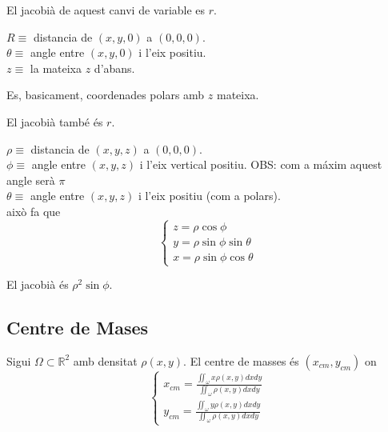 \documentclass[../main.tex]{subfiles}
\begin{document}
    \begin{proposicio}
        El jacobià de aquest canvi de variable es $r$.
    \end{proposicio}
    \begin{definicio}
        $\;$\\
        $R \equiv$ distancia de $(x,y,0)$ a $(0,0,0)$.\\
        $\theta \equiv$ angle entre $(x,y,0)$ i l'eix positiu.\\
        $z \equiv$ la mateixa $z$ d'abans.
        \begin{obs}
            Es, basicament, coordenades polars amb $z$ mateixa.
        \end{obs}
    \end{definicio}
    \begin{proposicio}
        El jacobià també és $r$.
    \end{proposicio}
    \begin{definicio}
        $\;$\\
        $\rho \equiv$ distancia de $(x,y,z)$ a $(0,0,0)$.\\
        $\phi \equiv$ angle entre $(x,y,z)$ i l'eix vertical positiu. OBS: com a máxim aquest angle serà $\pi$\\
        $\theta \equiv$ angle entre $(x,y,z)$ i l'eix positiu (com a polars).\\
        això fa que
        \begin{displaymath}
            \begin{cases}
                z = \rho\cos\phi\\
                y = \rho\sin\phi\sin\theta\\
                x = \rho\sin\phi\cos\theta
            \end{cases}
        \end{displaymath}
    \end{definicio}
    \begin{proposicio}
        El jacobià és $\rho^2\sin\phi$.
    \end{proposicio}
    \subsection{Centre de Mases}
    \begin{proposicio}
        Sigui $\Omega \subset \mathbb{R}^2$ amb densitat $\rho \left(x,y\right)$.
        El centre de masses és $\left(x_{cm}, y_{cm}\right)$ on
        \begin{displaymath}
            \begin{cases}
                x_{cm} = \frac{\iint_{\omega} x\rho\left(x,y\right) dxdy}{\iint_{\omega} \rho\left(x,y\right) dxdy}\\
                y_{cm} = \frac{\iint_{\omega} y\rho\left(x,y\right) dxdy}{\iint_{\omega} \rho\left(x,y\right) dxdy}
            \end{cases}
        \end{displaymath}
    \end{proposicio}
\end{document}
